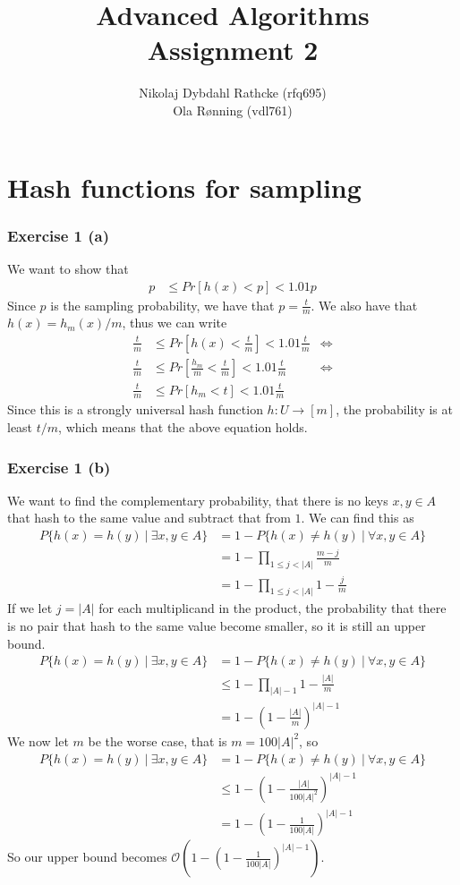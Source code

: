 \documentclass[a4paper]{article}
\author{Nikolaj Dybdahl Rathcke (rfq695) \\ Ola Rønning (vdl761)}
\title{Advanced Algorithms \\ Assignment 2}
\begin{document}
\maketitle

\section*{Hash functions for sampling}

\subsubsection*{Exercise 1 (a)}
We want to show that
\begin{align*}
p&\leq Pr[h(x) < p] < 1.01p
\end{align*}
Since $p$ is the sampling probability, we have that $p=\frac{t}{m}$. We also have that $h(x)=h_m(x)/m$, thus we can write
\begin{align*}
\frac{t}{m}&\leq Pr[h(x) < \frac{t}{m}] < 1.01\frac{t}{m} &\Leftrightarrow \\
\frac{t}{m}&\leq Pr[\frac{h_m}{m} < \frac{t}{m}] < 1.01\frac{t}{m} &\Leftrightarrow \\
\frac{t}{m}&\leq Pr[h_m < t] < 1.01\frac{t}{m}
\end{align*}
Since this is a strongly universal hash function $h : U\rightarrow [m]$, the probability is at least $t/m$, which means that the above equation holds.

\subsubsection*{Exercise 1 (b)}
We want to find the complementary probability, that there is no keys $x,y\in A$ that hash to the same value and subtract that from $1$. We can find this as
\begin{align*}
P\{h(x)=h(y)\ |\ \exists x,y\in A\}&=1-P\{h(x)\neq h(y)\ |\ \forall x,y\in A\}\\
&=1-\prod_{1\leq j<|A|}\frac{m-j}{m} \\
&=1-\prod_{1\leq j<|A|}1-\frac{j}{m}
\end{align*}
If we let $j=|A|$ for each multiplicand in the product, the probability that there is no pair that hash to the same value become smaller, so it is still an upper bound.
\begin{align*}
P\{h(x)=h(y)\ |\ \exists x,y\in A\}&=1-P\{h(x)\neq h(y)\ |\ \forall x,y\in A\}\\
&\leq 1-\prod_{|A|-1}1-\frac{|A|}{m} \\
&= 1-\left(1-\frac{|A|}{m}\right)^{|A|-1}
\end{align*}
We now let $m$ be the worse case, that is $m=100|A|^2$, so
\begin{align*}
P\{h(x)=h(y)\ |\ \exists x,y\in A\}&=1-P\{h(x)\neq h(y)\ |\ \forall x,y\in A\}\\
&\leq 1-\left(1-\frac{|A|}{100|A|^2}\right)^{|A|-1} \\
&= 1-\left(1-\frac{1}{100|A|}\right)^{|A|-1}
\end{align*}
So our upper bound becomes $\mathcal{O}\left(1-\left(1-\frac{1}{100|A|}\right)^{|A|-1}\right)$.
\end{document}
